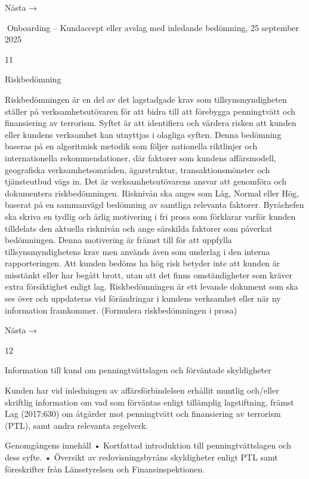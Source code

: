 Nästa →

Onboarding – Kundaccept eller avslag med inledande bedömning,
25 september 2025

11

Riskbedömning

Riskbedömningen är en del av det lagstadgade krav som tillsynsmyndigheten ställer på
verksamhetsutövaren för att bidra till att förebygga penningtvätt och finansiering av terrorism. Syftet är att identifiera och värdera risken att kunden eller kundens verksamhet
kan utnyttjas i olagliga syften.
Denna bedömning baseras på en algoritmisk metodik som följer nationella riktlinjer
och internationella rekommendationer, där faktorer som kundens affärsmodell, geografiska
verksamhetsområden, ägarstruktur, transaktionsmönster och tjänsteutbud vägs in.
Det är verksamhetsutövarens ansvar att genomföra och dokumentera riskbedömningen. Risknivån ska anges som Låg, Normal eller Hög, baserat på en sammanvägd bedömning av samtliga relevanta faktorer.
Byråchefen ska skriva en tydlig och ärlig motivering i fri prosa som förklarar varför
kunden tilldelats den aktuella risknivån och ange särskilda faktorer som påverkat bedömningen. Denna motivering är främst till för att uppfylla tillsynsmyndighetens krav men
används även som underlag i den interna rapporteringen.
Att kunden bedöms ha hög risk betyder inte att kunden är misstänkt eller har begått
brott, utan att det finns omständigheter som kräver extra försiktighet enligt lag.
Riskbedömningen är ett levande dokument som ska ses över och uppdateras vid förändringar i kundens verksamhet eller när ny information framkommer.
(Formulera riskbedömningen i prosa)

Nästa →

12

Information till kund om penningtvättslagen och
förväntade skyldigheter

Kunden har vid inledningen av affärsförbindelsen erhållit muntlig och/eller skriftlig information om vad som förväntas enligt tillämplig lagstiftning, främst Lag (2017:630) om
åtgärder mot penningtvätt och finansiering av terrorism (PTL), samt andra relevanta
regelverk.

Genomgångens innehåll
• Kortfattad introduktion till penningtvättslagen och dess syfte.
• Översikt av redovisningsbyråns skyldigheter enligt PTL samt föreskrifter från Länsstyrelsen och Finansinspektionen.

